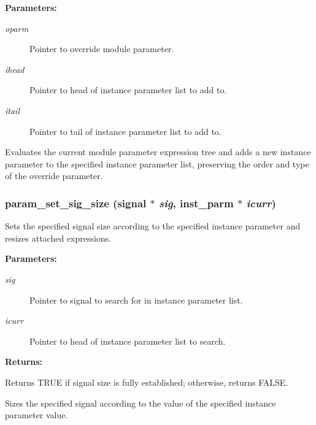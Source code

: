 \begin{Desc}
\item[{\bf Parameters: }]\par
\begin{description}
\item[
{\em oparm}]Pointer to override module parameter. \item[
{\em ihead}]Pointer to head of instance parameter list to add to. \item[
{\em itail}]Pointer to tail of instance parameter list to add to.

\end{description}
\end{Desc}
Evaluates the current module parameter expression tree and adds a new instance parameter to the specified instance parameter list, preserving the order and type of the override parameter. 
\subsubsection{ param\_\-set\_\-sig\_\-size ({\bf signal} $\ast$ {\em sig}, {\bf inst\_\-parm} $\ast$ {\em icurr})}\label{param_8c_a12}


Sets the specified signal size according to the specified instance parameter and resizes attached expressions.

\begin{Desc}
\item[{\bf Parameters: }]\par
\begin{description}
\item[
{\em sig}]Pointer to signal to search for in instance parameter list. \item[
{\em icurr}]Pointer to head of instance parameter list to search.

\end{description}
\end{Desc}
\begin{Desc}
\item[{\bf Returns: }]\par
Returns TRUE if signal size is fully established; otherwise, returns FALSE.

\end{Desc}
Sizes the specified signal according to the value of the specified instance parameter value. 

